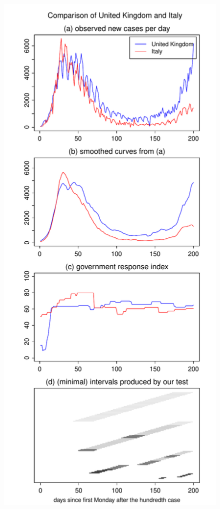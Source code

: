 \documentclass[a4paper,12pt]{article}
\numberwithin{equation}{section}
\begin{document}
{\begin{figure}[h!]
\begin{minipage}[t]{0.49\textwidth}
\includegraphics[width=\textwidth]{plots/GBR_vs_ITA_four_countries}

\end{minipage}
\end{figure}}
\end{document}
